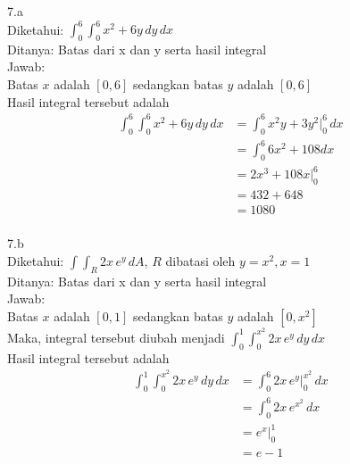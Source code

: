 \documentclass{article}
\begin{document}
    7.a \\
    Diketahui: \(\int_{0}^{6}\int_{0}^{6} x^2 + 6y \, dy \, dx\) \\
    Ditanya: Batas dari x dan y serta hasil integral \\
    Jawab: \\
    Batas \(x\) adalah \([0, 6]\) sedangkan batas \(y\) adalah \([0, 6]\) \\
    Hasil integral tersebut adalah
    \begin{displaymath}
        \begin{split}
            \int_{0}^{6}\int_{0}^{6} x^2 + 6y \, dy \, dx &= \int_{0}^{6} x^2y + 3y^2 \biggr \vert _0 ^6  \, dx\ \\
            &= \int _0 ^6 6x^2 + 108 dx \\
            &= 2x^3 + 108x \biggr \vert _0 ^6 \\
            &= 432 + 648 \\
            &= 1080 \\
        \end{split}
    \end{displaymath}

    7.b \\
    Diketahui: \(\int\int_{R} 2x \, e^y \, dA\), \(R\) dibatasi oleh \(y = x^2, x = 1\) \\
    Ditanya: Batas dari x dan y serta hasil integral \\
    Jawab: \\
    Batas \(x\) adalah \([0, 1]\) sedangkan batas \(y\) adalah \([0, x^2]\) \\
    Maka, integral tersebut diubah menjadi \(\int _0 ^1 \int_0 ^{x^2} 2x \, e^y \, dy \, dx\) \\
    Hasil integral tersebut adalah
    \begin{displaymath}
        \begin{split}
            \int _0 ^1 \int_0 ^{x^2} 2x \, e^y \, dy \, dx &= \int_0 ^6 2x \, e^y \biggr \vert _0 ^{x^2}  \, dx\ \\
            &= \int_0 ^6 2x \, e^{x^2} \, dx\ \\
            &= e^x \biggr \vert _0 ^1 \\
            &= e - 1 \\
        \end{split}
    \end{displaymath}
\end{document}
